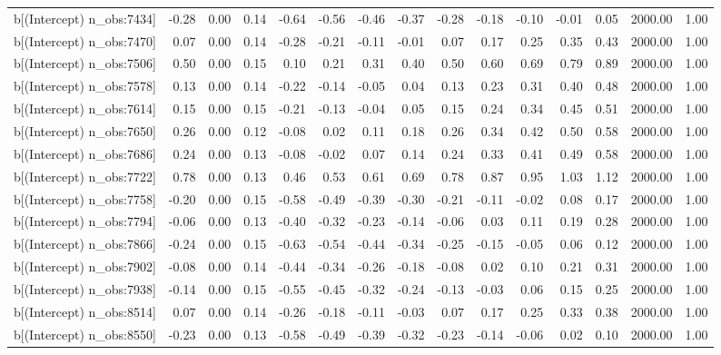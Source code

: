 \begin{table}[ht]
\begin{tabular}{rrrrrrrrrrrrrrr}
  b[(Intercept) n\_obs:7434] & -0.28 & 0.00 & 0.14 & -0.64 & -0.56 & -0.46 & -0.37 & -0.28 & -0.18 & -0.10 & -0.01 & 0.05 & 2000.00 & 1.00 \\ 
  b[(Intercept) n\_obs:7470] & 0.07 & 0.00 & 0.14 & -0.28 & -0.21 & -0.11 & -0.01 & 0.07 & 0.17 & 0.25 & 0.35 & 0.43 & 2000.00 & 1.00 \\ 
  b[(Intercept) n\_obs:7506] & 0.50 & 0.00 & 0.15 & 0.10 & 0.21 & 0.31 & 0.40 & 0.50 & 0.60 & 0.69 & 0.79 & 0.89 & 2000.00 & 1.00 \\ 
  b[(Intercept) n\_obs:7578] & 0.13 & 0.00 & 0.14 & -0.22 & -0.14 & -0.05 & 0.04 & 0.13 & 0.23 & 0.31 & 0.40 & 0.48 & 2000.00 & 1.00 \\ 
  b[(Intercept) n\_obs:7614] & 0.15 & 0.00 & 0.15 & -0.21 & -0.13 & -0.04 & 0.05 & 0.15 & 0.24 & 0.34 & 0.45 & 0.51 & 2000.00 & 1.00 \\ 
  b[(Intercept) n\_obs:7650] & 0.26 & 0.00 & 0.12 & -0.08 & 0.02 & 0.11 & 0.18 & 0.26 & 0.34 & 0.42 & 0.50 & 0.58 & 2000.00 & 1.00 \\ 
  b[(Intercept) n\_obs:7686] & 0.24 & 0.00 & 0.13 & -0.08 & -0.02 & 0.07 & 0.14 & 0.24 & 0.33 & 0.41 & 0.49 & 0.58 & 2000.00 & 1.00 \\ 
  b[(Intercept) n\_obs:7722] & 0.78 & 0.00 & 0.13 & 0.46 & 0.53 & 0.61 & 0.69 & 0.78 & 0.87 & 0.95 & 1.03 & 1.12 & 2000.00 & 1.00 \\ 
  b[(Intercept) n\_obs:7758] & -0.20 & 0.00 & 0.15 & -0.58 & -0.49 & -0.39 & -0.30 & -0.21 & -0.11 & -0.02 & 0.08 & 0.17 & 2000.00 & 1.00 \\ 
  b[(Intercept) n\_obs:7794] & -0.06 & 0.00 & 0.13 & -0.40 & -0.32 & -0.23 & -0.14 & -0.06 & 0.03 & 0.11 & 0.19 & 0.28 & 2000.00 & 1.00 \\ 
  b[(Intercept) n\_obs:7866] & -0.24 & 0.00 & 0.15 & -0.63 & -0.54 & -0.44 & -0.34 & -0.25 & -0.15 & -0.05 & 0.06 & 0.12 & 2000.00 & 1.00 \\ 
  b[(Intercept) n\_obs:7902] & -0.08 & 0.00 & 0.14 & -0.44 & -0.34 & -0.26 & -0.18 & -0.08 & 0.02 & 0.10 & 0.21 & 0.31 & 2000.00 & 1.00 \\ 
  b[(Intercept) n\_obs:7938] & -0.14 & 0.00 & 0.15 & -0.55 & -0.45 & -0.32 & -0.24 & -0.13 & -0.03 & 0.06 & 0.15 & 0.25 & 2000.00 & 1.00 \\ 
  b[(Intercept) n\_obs:8514] & 0.07 & 0.00 & 0.14 & -0.26 & -0.18 & -0.11 & -0.03 & 0.07 & 0.17 & 0.25 & 0.33 & 0.38 & 2000.00 & 1.00 \\ 
  b[(Intercept) n\_obs:8550] & -0.23 & 0.00 & 0.13 & -0.58 & -0.49 & -0.39 & -0.32 & -0.23 & -0.14 & -0.06 & 0.02 & 0.10 & 2000.00 & 1.00 \\ 

\end{tabular}
\end{table}
